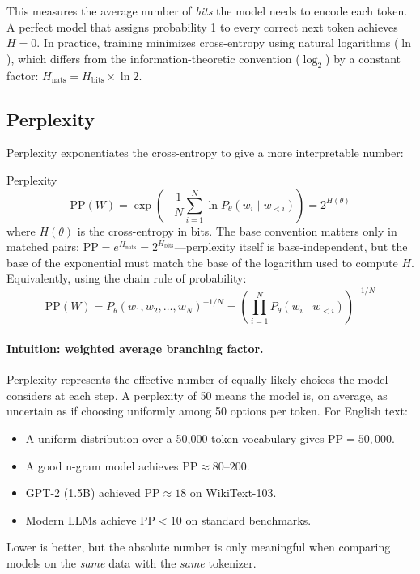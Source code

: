 This measures the average number of \emph{bits} the model needs to encode each
token.  A perfect model that assigns probability 1 to every correct next token
achieves $H = 0$.  In practice, training minimizes cross-entropy using natural
logarithms ($\ln$), which differs from the information-theoretic convention
($\log_2$) by a constant factor: $H_{\text{nats}} = H_{\text{bits}} \times \ln 2$.

\subsection{Perplexity}

Perplexity exponentiates the cross-entropy to give a more interpretable number:

\begin{mathresult}{Perplexity}
\[
    \text{PP}(W) = \exp\!\left(-\frac{1}{N}\sum_{i=1}^{N}\ln P_\theta(w_i \mid w_{<i})\right)
    = 2^{H(\theta)}
\]
where $H(\theta)$ is the cross-entropy in bits.  The base convention matters only
in matched pairs: $\text{PP} = e^{H_{\text{nats}}} = 2^{H_{\text{bits}}}$---perplexity
itself is base-independent, but the base of the exponential must match the base of
the logarithm used to compute $H$.  Equivalently, using the chain rule
of probability:
\[
    \text{PP}(W) = P_\theta(w_1, w_2, \ldots, w_N)^{-1/N}
    = \left(\prod_{i=1}^{N} P_\theta(w_i \mid w_{<i})\right)^{-1/N}
\]
\end{mathresult}

\paragraph{Intuition: weighted average branching factor.}
Perplexity represents the effective number of equally likely choices the model
considers at each step.  A perplexity of 50 means the model is, on average, as
uncertain as if choosing uniformly among 50 options per token.  For English text:
\begin{itemize}
    \item A uniform distribution over a 50,000-token vocabulary gives
          $\text{PP} = 50{,}000$.
    \item A good n-gram model achieves $\text{PP} \approx 80\text{--}200$.
    \item GPT-2 (1.5B) achieved $\text{PP} \approx 18$ on WikiText-103.
    \item Modern LLMs achieve $\text{PP} < 10$ on standard benchmarks.
\end{itemize}
Lower is better, but the absolute number is only meaningful when comparing models
on the \emph{same} data with the \emph{same} tokenizer.

